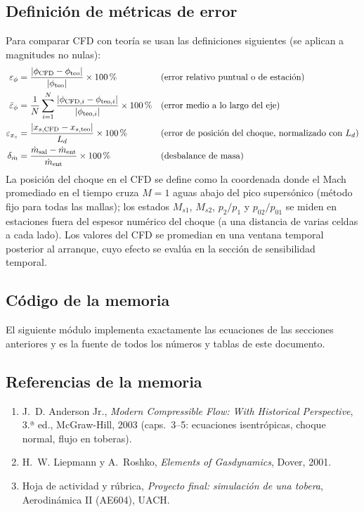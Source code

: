 \subsection{Definición de métricas de error}
Para comparar CFD con teoría se usan las definiciones siguientes (se aplican a magnitudes no nulas):
\begin{align}
\varepsilon_\phi&=\frac{|\phi_{\rm CFD}-\phi_{\rm teo}|}{|\phi_{\rm teo}|}\times100\,\%&&\text{(error relativo puntual o de estación)}\\
\bar\varepsilon_\phi&=\frac1N\sum_{i=1}^{N}\frac{|\phi_{{\rm CFD},i}-\phi_{{\rm teo},i}|}{|\phi_{{\rm teo},i}|}\times100\,\%&&\text{(error medio a lo largo del eje)}\\
\varepsilon_{x_s}&=\frac{|x_{s,\rm CFD}-x_{s,\rm teo}|}{L_d}\times100\,\%&&\text{(error de posición del choque, normalizado con $L_d$)}\\
\delta_{\dot m}&=\frac{\dot m_{\rm sal}-\dot m_{\rm ent}}{\dot m_{\rm ent}}\times100\,\%&&\text{(desbalance de masa)}
\end{align}
La posición del choque en el CFD se define como la coordenada donde el Mach promediado en el tiempo cruza $M=1$ aguas abajo del pico supersónico
(método fijo para todas las mallas); los estados $M_{s1}$, $M_{s2}$, $p_2/p_1$ y $p_{02}/p_{01}$ se miden en estaciones fuera del espesor numérico del choque
(a una distancia de varias celdas a cada lado). Los valores del CFD se promedian en una ventana temporal posterior al arranque, cuyo efecto se evalúa en la sección de sensibilidad temporal.


\subsection{Código de la memoria}\label{m:cod}
El siguiente módulo implementa exactamente las ecuaciones de las secciones anteriores y es la fuente de todos los números y tablas de este documento.


\subsection*{Referencias de la memoria}
\begin{enumerate}[leftmargin=2em]
\item J.~D. Anderson Jr., \emph{Modern Compressible Flow: With Historical Perspective}, 3.ª ed., McGraw-Hill, 2003 (caps.~3--5: ecuaciones isentrópicas, choque normal, flujo en toberas).
\item H.~W. Liepmann y A.~Roshko, \emph{Elements of Gasdynamics}, Dover, 2001.
\item Hoja de actividad y rúbrica, \emph{Proyecto final: simulación de una tobera}, Aerodinámica II (AE604), UACH.
\end{enumerate}
